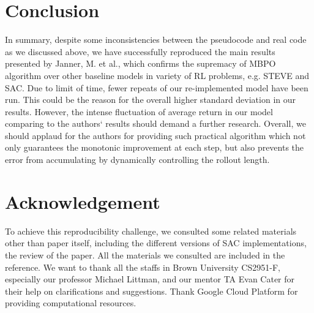 \documentclass{article}
\begin{document}
\section{Conclusion}
In summary, despite some inconsistencies between the pseudocode and real code as we discussed above, we have successfully reproduced the main results presented by Janner, M. et al., which confirms the supremacy of MBPO algorithm over other baseline models in variety of RL problems, e.g. STEVE and SAC. Due to limit of time, fewer repeats of our re-implemented model have been run. This could be the reason for the overall higher standard deviation in our results. However, the intense fluctuation of average return in our model comparing to the authors` results should demand a further research. Overall, we should applaud for the authors for providing such practical algorithm which not only guarantees the monotonic improvement at each step, but also prevents the error from accumulating by dynamically controlling the rollout length.

\section*{Acknowledgement}
To achieve this reproducibility challenge, we consulted some related materials other than paper itself, including the different versions of SAC implementations, the review of the paper. All the materials we consulted are included in the reference.
We want to thank all the staffs in Brown University CS2951-F, especially our professor Michael Littman, and our mentor TA Evan Cater for their help on clarifications and suggestions. Thank Google Cloud Platform for providing computational resources.
\end{document}
